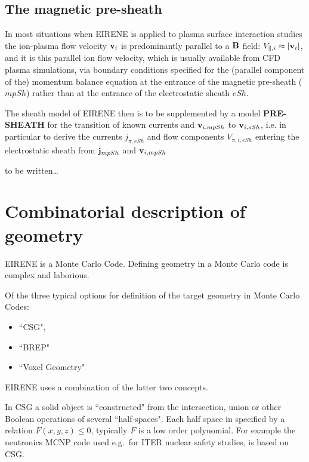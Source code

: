 \subsection{The magnetic pre-sheath} \label{sec1.4.2}

In most situations when EIRENE is applied to plasma surface interaction studies
the ion-plasma flow velocity $\mathbf{v}_i$ is predominantly parallel to a $\mathbf{B}$
field: $V_{\parallel,i} \approx |\mathbf{v}_i|$, and it is this parallel ion flow
velocity, which is usually available from \ac{CFD} plasma simulations, via
boundary conditions specified for the (parallel component of the) momentum
balance equation at the entrance of the magnetic pre-sheath ($mpSh$) rather
than at the entrance of the electrostatic sheath $eSh$.

The sheath model of EIRENE then is to be supplemented by a model
\textbf{PRE-SHEATH} for the transition of known currents and $\mathbf{v}_{i,mpSh}$  to
$\mathbf{v}_{i,eSh}$, i.e. in particular to derive the currents $j_{\pi,eSh}$ and flow
components $V_{\pi,i,eSh}$ entering the electrostatic sheath from $\mathbf{j}_{mpSh}$
and $\mathbf{v}_{i,mpSh}$ 

to be written\dots 

\newpage 

\section{Combinatorial description of geometry} \label{sec1.5}

EIRENE is a Monte Carlo Code.
Defining geometry in a Monte Carlo code is complex and laborious.

Of the three typical options for definition of the target geometry in Monte
Carlo Codes:
\begin{itemize}
  \item ``\ac{CSG}",
  \item ``\ac{BREP}"
  \item ``Voxel Geometry"
\end{itemize}
EIRENE uses a combination of the latter two concepts.

\medskip

In \ac{CSG} a solid object is ``constructed" from the intersection, union or
other Boolean operations of several ``half-spaces".
Each half space in specified by a relation $F(x,y,z)\le 0$, typically $F$ is a
low order polynomial.
For example the neutronics \ac{MCNP} code used e.g.\ for ITER nuclear safety
studies, is based on \ac{CSG}.

